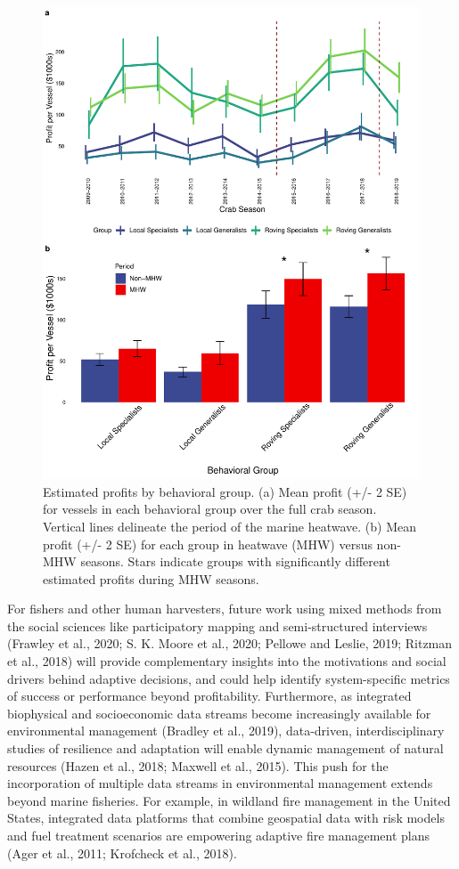 \documentclass[]{elsarticle} %
\begin{document}
\begin{figure}%
\includegraphics[width=\linewidth]{fig_profits.pdf}
\caption{Estimated profits by behavioral group. (a) Mean profit (+/- 2 SE) for vessels in each behavioral group over the full crab season. Vertical lines delineate the period of the marine heatwave. (b) Mean profit (+/- 2 SE) for each group in heatwave (MHW) versus non-MHW seasons. Stars indicate groups with significantly different estimated profits during MHW seasons.}
\label{fig:profits}
\end{figure}

For fishers and other human harvesters, future work using mixed methods
from the social sciences like participatory mapping and semi-structured
interviews (Frawley et al., 2020; S. K. Moore et al., 2020; Pellowe and
Leslie, 2019; Ritzman et al., 2018) will provide complementary insights
into the motivations and social drivers behind adaptive decisions, and
could help identify system-specific metrics of success or performance
beyond profitability. Furthermore, as integrated biophysical and
socioeconomic data streams become increasingly available for
environmental management (Bradley et al., 2019), data-driven,
interdisciplinary studies of resilience and adaptation will enable
dynamic management of natural resources (Hazen et al., 2018; Maxwell et
al., 2015). This push for the incorporation of multiple data streams in
environmental management extends beyond marine fisheries. For example,
in wildland fire management in the United States, integrated data
platforms that combine geospatial data with risk models and fuel
treatment scenarios are empowering adaptive fire management plans (Ager
et al., 2011; Krofcheck et al., 2018).
\end{document}
